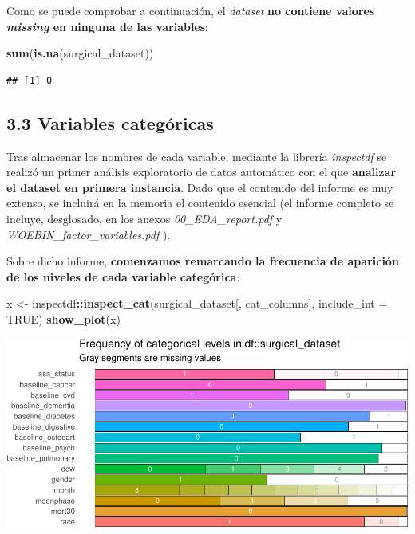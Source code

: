 \documentclass[
]{article}
\newenvironment{Shaded}{\begin{snugshade}}{\end{snugshade}}
\newcommand{\DataTypeTok}[1]{\textcolor[rgb]{0.13,0.29,0.53}{#1}}
\newcommand{\KeywordTok}[1]{\textcolor[rgb]{0.13,0.29,0.53}{\textbf{#1}}}
\newcommand{\NormalTok}[1]{#1}
\newcommand{\OperatorTok}[1]{\textcolor[rgb]{0.81,0.36,0.00}{\textbf{#1}}}
\newcommand{\OtherTok}[1]{\textcolor[rgb]{0.56,0.35,0.01}{#1}}
\newcommand{\StringTok}[1]{\textcolor[rgb]{0.31,0.60,0.02}{#1}}
\begin{document}
Como se puede comprobar a continuación, el \emph{dataset} \textbf{no
contiene valores \emph{missing} en ninguna de las variables}:

\begin{Shaded}
\begin{Highlighting}[]
\KeywordTok{sum}\NormalTok{(}\KeywordTok{is.na}\NormalTok{(surgical\_dataset))}
\end{Highlighting}
\end{Shaded}

\begin{verbatim}
## [1] 0
\end{verbatim}

\hypertarget{variables-categuxf3ricas}{%
\subsection{3.3 Variables categóricas}\label{variables-categuxf3ricas}}

Tras almacenar los nombres de cada variable, mediante la librería
\emph{inspectdf} se realizó un primer análisis exploratorio de datos
automático con el que \textbf{analizar el dataset en primera instancia}.
Dado que el contenido del informe es muy extenso, se incluirá en la
memoria el contenido esencial (el informe completo se incluye,
desglosado, en los anexos \emph{00\_EDA\_report.pdf} y
\emph{WOEBIN\_factor\_variables.pdf} ).

Sobre dicho informe, \textbf{comenzamos remarcando la frecuencia de
aparición de los niveles de cada variable categórica}:

\begin{Shaded}
\begin{Highlighting}[]
\NormalTok{x <{-}}\StringTok{ }\NormalTok{inspectdf}\OperatorTok{::}\KeywordTok{inspect\_cat}\NormalTok{(surgical\_dataset[, cat\_columns], }\DataTypeTok{include\_int =} \OtherTok{TRUE}\NormalTok{)}
\KeywordTok{show\_plot}\NormalTok{(x)}
\end{Highlighting}
\end{Shaded}

\includegraphics{memoria_files/figure-latex/unnamed-chunk-7-1}
\end{document}
